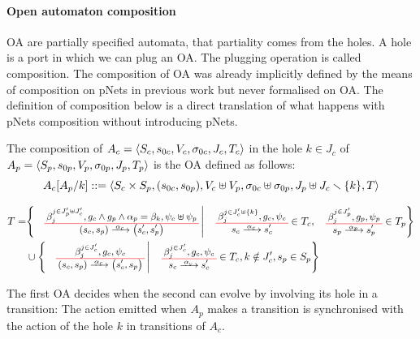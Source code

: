\documentclass[runningheads]{llncs}
\begin{document}
\paragraph{Open automaton composition}

OA are partially specified automata, that partiality comes  from the holes.
A hole is a port in which we can plug an OA.
The plugging operation is called composition.
The composition of OA was already implicitly defined by the means of composition on pNets in previous work \cite{henrio:01299562} but never  formalised on OA.
The definition of composition below is a direct translation of what happens with pNets composition without  introducing pNets.






\begin{definition} \label{Def:CompOA}
The composition of \(A_c = \OAg[c]\) in the hole \(k \in J_c\) of  \(A_p = \OAg[p]\) is the OA defined as follows:
\[A_c\subst{A_p}{k} ::=  \OA{S_c \times S_p}{\mpar{s_{0c}, s_{0p}}}{V_c \uplus V_p}{\sigma_{0c} \uplus \sigma_{0p}}{J_p \uplus J_c \setminus \mbrc{k}}{T} \] 

\begin{align*}
T=& \mset{\OT{\mpar{s_c, s_p}}{\mpar{s'_c, s'_p}}{\alpha_c}{\beta_j^{j \in J'_p \uplus J'_c}}{g_c \wedge g_p \wedge \alpha_p = \beta_k}{\psi_c \uplus \psi_p}}{ \OT{s_c}{s'_c}{\alpha_c}{\beta_j^{j \in J'_c \uplus \mbrc{k} }}{g_c}{\psi_c} \in T_c, \OTx{p}{}{}{p} \in T_p} \\
	& \cup \mset{\OT{\mpar{s_c, s_p}}{\mpar{s'_c, s_p}}{\alpha_c}{\beta_j^{j \in J'_c}}{g_c}{\psi_c}}{\OTx{c}{}{}{c} \in T_c, k \notin J'_c, s_p \in S_p}
\end{align*}
\end{definition}

The first OA decides when the second can evolve by involving its hole in a transition:
The action emitted when \(A_p\) makes a transition is synchronised with the action of the hole \(k\) in transitions of \(A_c\).
\end{document}
